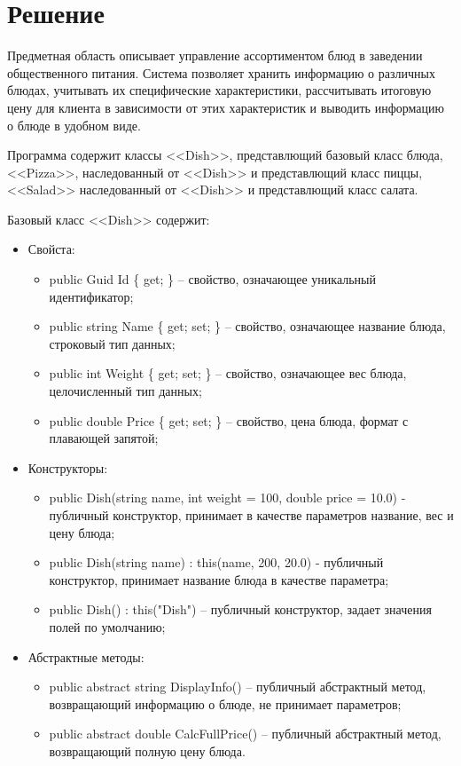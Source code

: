\documentclass[a4paper,14pt]{extarticle}
\begin{document}
\section*{\hspace{12.5mm}Решение}
Предметная область описывает управление ассортиментом блюд в заведении общественного питания. Система позволяет хранить информацию о различных блюдах, учитывать их специфические характеристики, рассчитывать итоговую цену для клиента в зависимости от этих характеристик и выводить информацию о блюде в удобном виде.

Программа содержит классы <<Dish>>, представлющий базовый класс блюда,  <<Pizza>>, наследованный от <<Dish>> и представлющий класс пиццы, <<Salad>> наследованный от <<Dish>> и представлющий класс салата.

Базовый класс <<Dish>> содержит:
\begin{itemize}
  \item[--] Свойста:
  \begin{itemize}
    \item[--] public Guid Id \{ get; \} -- свойство, означающее уникальный идентификатор;
    \item[--] public string Name \{ get; set; \} -- свойство, означающее название блюда, строковый тип данных;
    \item[--] public int Weight \{ get; set; \} -- свойство, означающее вес блюда, целочисленный тип данных;
    \item[--] public double Price \{ get; set; \} -- свойство, цена блюда, формат с плавающей запятой;
  \end{itemize}
  \item[--] Конструкторы:
  \begin{itemize}
    \item[--] public Dish(string name, int weight = 100, double price = 10.0) - публичный конструктор, принимает  в качестве параметров название, вес и цену блюда;
    \item[--] public Dish(string name) : this(name, 200, 20.0) - публичный конструктор, принимает название блюда в качестве параметра;
    \item[--] public Dish() : this("Dish") -- публичный конструктор, задает значения полей по умолчанию;
  \end{itemize}
  \item[--] Абстрактные методы:
  \begin{itemize}
    \item[--] public abstract string DisplayInfo() -- публичный абстрактный метод, возвращающий информацию о блюде, не принимает параметров;
    \item[--] public abstract double CalcFullPrice() -- публичный абстрактный метод, возвращающий полную цену блюда.
  \end{itemize}
\end{itemize}
\end{document}
